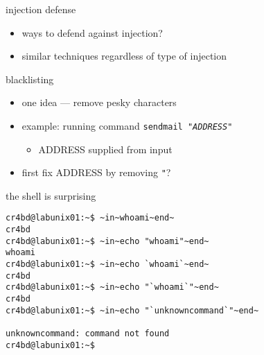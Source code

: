 


    


\begin{frame}{injection defense}
    \begin{itemize}
    \item ways to defend against injection?
    \item similar techniques regardless of type of injection
    \end{itemize}
\end{frame}
    


\begin{frame}{blacklisting}
    \begin{itemize}
        \item one idea --- remove pesky characters
        \item example: running command \texttt{sendmail "{\color{red}\textit{ADDRESS}}"}
            \begin{itemize}
                \item ADDRESS supplied from input
            \end{itemize}
        \item first fix ADDRESS by removing \texttt{"}?
    \end{itemize}
\end{frame}

\begin{frame}[fragile,label=shellMisquoting]{the shell is surprising}
\begin{lstlisting}
cr4bd@labunix01:~$ ~in~whoami~end~
cr4bd
cr4bd@labunix01:~$ ~in~echo "whoami"~end~
whoami
cr4bd@labunix01:~$ ~in~echo `whoami`~end~
cr4bd
cr4bd@labunix01:~$ ~in~echo "`whoami`"~end~
cr4bd
cr4bd@labunix01:~$ ~in~echo "`unknowncommand`"~end~

unknowncommand: command not found
cr4bd@labunix01:~$ 
\end{lstlisting}
\end{frame}


